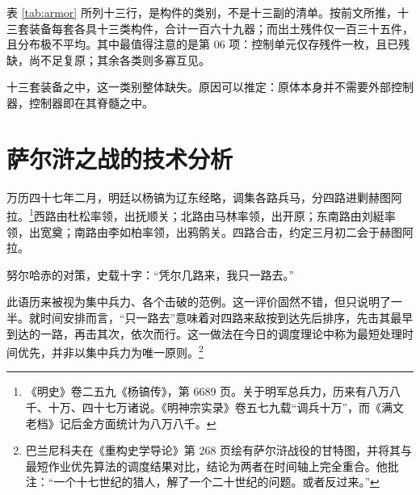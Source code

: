 表 \ref{tab:armor} 所列十三行，是构件的类别，不是十三副的清单。按前文所推，十三套装备每套各具十三类构件，合计一百六十九器；而出土残件仅一百三十五件，且分布极不平均。其中最值得注意的是第 06 项：控制单元仅存残件一枚，且已残缺，尚不足复原；其余各类则多寡互见。

十三套装备之中，这一类别整体缺失。原因可以推定：原体本身并不需要外部控制器，控制器即在其脊髓之中。

\section{萨尔浒之战的技术分析}

万历四十七年二月，明廷以杨镐为辽东经略，调集各路兵马，分四路进剿赫图阿拉。\footnote{《明史》卷二五九《杨镐传》，第 6689 页。关于明军总兵力，历来有八万八千、十万、四十七万诸说。《明神宗实录》卷五七九载“调兵十万”，而《满文老档》记后金方面统计为八万八千。}西路由杜松率领，出抚顺关；北路由马林率领，出开原；东南路由刘綎率领，出宽奠；南路由李如柏率领，出鸦鹘关。四路合击，约定三月初二会于赫图阿拉。

努尔哈赤的对策，史载十字：“凭尔几路来，我只一路去。”

此语历来被视为集中兵力、各个击破的范例。这一评价固然不错，但只说明了一半。就时间安排而言，“只一路去”意味着对四路来敌按到达先后排序，先击其最早到达的一路，再击其次，依次而行。这一做法在今日的调度理论中称为最短处理时间优先，并非以集中兵力为唯一原则。\footnote{巴兰尼科夫在《重构史学导论》第 268 页绘有萨尔浒战役的甘特图，并将其与最短作业优先算法的调度结果对比，结论为两者在时间轴上完全重合。他批注：“一个十七世纪的猎人，解了一个二十世纪的问题。或者反过来。”}

